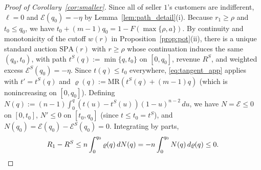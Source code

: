 \documentclass[12pt]{article}
\theoremstyle{mystyle}
\theoremstyle{mystyle2}
\newcommand{\SPA}{\mathrm{SPA}}
\newcommand{\1}{\mathbf{1}}
\begin{document}
\begin{proof}[Proof of Corollary~\ref{cor:smaller}]
Since all of seller $1$'s customers are indifferent, $\ell=0$ and $\mathcal E(q_0)=-\eta$ by Lemma~\ref{lem:path_detail}(i). Because $r_1\ge\rho$ and $t_0\le q_0$, we have $t_0+(m-1)q_0=1-F(\max\{\rho,a\})$. By continuity and monotonicity of the cutoff $w(r)$ in Proposition~\ref{prop:pot}(ii), there is a unique standard auction $\SPA(r)$ with $r\ge\rho$ whose continuation induces the same $(q_0,t_0)$, with path $t^S(q):=\min\{q,t_0\}$ on $[0,q_0]$, revenue $R^S$, and weighted excess $\mathcal E^S(q_0)=-\eta$. Since $t(q)\le t_0$ everywhere, \eqref{eq:tangent_app} applies with $t'=t^S(q)$ and $\varrho(q):=\mathrm{MR}(t^S(q)+(m-1)q)$ (which is nonincreasing on $[0,q_0]$). Defining $N(q):=(n-1)\int_0^q(t(u)-t^S(u))(1-u)^{n-2}\,du$, we have $N=\mathcal E\le 0$ on $[0,t_0]$, $N'\le 0$ on $[t_0,q_0]$ (since $t\le t_0=t^S$), and $N(q_0)=\mathcal E(q_0)-\mathcal E^S(q_0)=0$. Integrating by parts,
\[
R_1 - R^S \le n\int_0^{q_0}\varrho(q)\,dN(q) = -n\int_0^{q_0} N(q)\,d\varrho(q) \le 0. \qedhere
\]
\end{proof}
\end{document}
